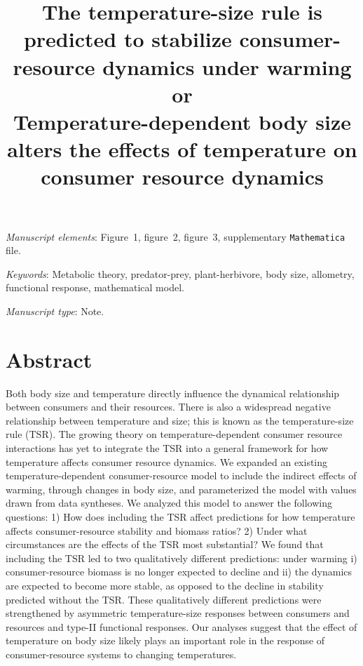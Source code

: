 \documentclass[11pt]{article}
\title{The temperature-size rule is predicted to stabilize consumer-resource dynamics under warming\\
or\\
Temperature-dependent body size alters the effects of temperature on consumer resource dynamics}
\date{}
\begin{document}
\maketitle

%
%

\bigskip

\textit{Manuscript elements}: Figure~1, figure~2, figure~3, supplementary \texttt{Mathematica} file.
\bigskip

\textit{Keywords}: Metabolic theory, predator-prey, plant-herbivore, body size, allometry, functional response, mathematical model.

\bigskip

\textit{Manuscript type}: Note. 

\bigskip


\linenumbers{}
\modulolinenumbers[3]

\newpage{}

\section*{Abstract}
Both body size and temperature directly influence the dynamical relationship between consumers and their resources. There is also a widespread negative relationship between temperature and size; this is known as the temperature-size rule (TSR). The growing theory on temperature-dependent consumer resource interactions has yet to integrate the TSR into a general framework for how temperature affects consumer resource dynamics. 
We expanded an existing temperature-dependent consumer-resource model to include the indirect effects of warming, through changes in body size, and parameterized the model with values drawn from data syntheses. 
We analyzed this model to answer the following questions: 
1) How does including the TSR affect predictions for how temperature affects consumer-resource stability and biomass ratios? 
2) Under what circumstances are the effects of the TSR most substantial? 
We found that including the TSR led to two qualitatively different predictions: under warming i) consumer-resource biomass is no longer expected to decline and ii) the dynamics are expected to become more stable, as opposed to the decline in stability predicted without the TSR. 
These qualitatively different predictions were strengthened by asymmetric temperature-size responses between consumers and resources and type-II functional responses.
Our analyses suggest that the effect of temperature on body size likely plays an important role in the response of consumer-resource systems to changing temperatures. 
\end{document}
